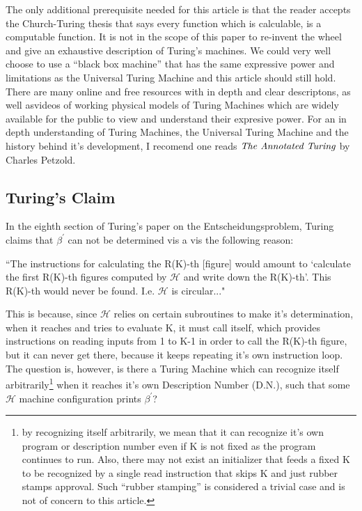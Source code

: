 \documentclass[11pt]{article}
\begin{document}
The only additional prerequisite needed for this article is that the reader accepts the Church-Turing thesis that says every function which is calculable, is a computable function. It is not in the scope of this paper to re-invent the wheel and give an exhaustive description of Turing's machines. We could very well choose to use a ``black box machine'' that has the same expressive power and limitations as the Universal Turing Machine and this article should still hold. There are many online and free resources with in depth and clear descriptons, as well asvideos of working physical models of Turing Machines which are widely available for the public to view and understand their expresive power. For an in depth understanding of Turing Machines, the Universal Turing Machine and the history behind it's development, I recomend one reads $\emph{The Annotated Turing}$ by Charles Petzold. \cite{Petzold}

\subsection{Turing's Claim}
In the eighth section of Turing's paper on the Entscheidungsproblem, Turing claims that $\beta^{'}$ can not be determined vis a vis the following reason:

``The instructions for calculating the R(K)-th [figure] would amount to `calculate the first R(K)-th figures computed by $\mathscr{H}$ and write down the R(K)-th'. This R(K)-th would never be found. I.e. $\mathscr{H}$ is circular..." \cite{Turing}

This is because, since $\mathscr{H}$ relies on certain subroutines to make it's determination, when it reaches and tries to evaluate K, it must call itself, which provides instructions on reading inputs from 1 to K-1 in order to call the R(K)-th figure, but it can never get there, because it keeps repeating it's own instruction loop. \cite{Turing} The question is, however, is there a Turing Machine which can recognize itself arbitrarily\footnote{by recognizing itself arbitrarily, we mean that it can recognize it's own program or description number even if K is not fixed as the program continues to run. Also, there may not exist an initializer that feeds a fixed K to be recognized by a single read instruction that skips K and just rubber stamps approval. Such ``rubber stamping'' is considered a trivial case and is not of concern to this article.} when it reaches it's own Description Number (D.N.), such that some $\mathscr{H}$ machine configuration prints $\beta^{'}$?
\end{document}
